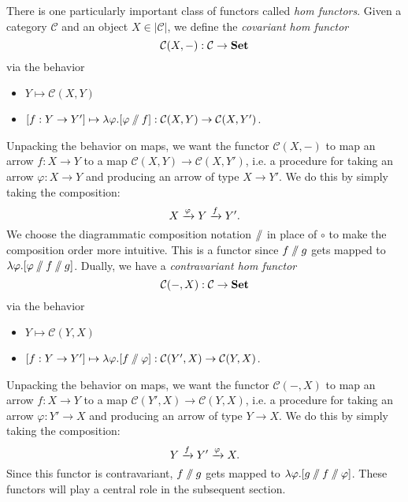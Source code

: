 There is one particularly important class of functors called \emph{hom functors}. Given a category $\mathcal{C}$ and an object $X\in|\mathcal{C}|$, we define the \emph{covariant hom functor}
\[\mathcal{C}(X,-):\mathcal{C}\to\mathbf{Set}\]
via the behavior
\begin{itemize}
\item $Y\mapsto \mathcal{C}(X,Y)$
\item $[f:Y\to Y']\mapsto \lambda \varphi.[\varphi\sslash f]:\mathcal{C}(X,Y)\to\mathcal{C}(X,Y')$.
\end{itemize}
Unpacking the behavior on maps, we want the functor $\mathcal{C}(X,-)$ to map an arrow $f:X\to Y$ to a map $\mathcal{C}(X,Y)\to\mathcal{C}(X,Y')$, i.e. a procedure for taking an arrow $\varphi:X\to Y$ and producing an arrow of type $X\to Y'$. We do this by simply taking the composition:
\[X\xrightarrow{\varphi} Y\xrightarrow{f} Y'.\]
We choose the diagrammatic composition notation $\sslash$ in place of $\circ$ to make the composition order more intuitive. This is a functor since $f\sslash g$ gets mapped to $\lambda\varphi.[\varphi\sslash f\sslash g]$. Dually, we have a \emph{contravariant hom functor} 
\[\mathcal{C}(-,X):\mathcal{C}\to\mathbf{Set}\]
via the behavior
\begin{itemize}
\item $Y\mapsto \mathcal{C}(Y,X)$
\item $[f:Y\to Y']\mapsto \lambda \varphi.[f\sslash \varphi]:\mathcal{C}(Y',X)\to\mathcal{C}(Y,X)$.
\end{itemize}
Unpacking the behavior on maps, we want the functor $\mathcal{C}(-,X)$ to map an arrow $f:X\to Y$ to a map $\mathcal{C}(Y',X)\to\mathcal{C}(Y,X)$, i.e. a procedure for taking an arrow $\varphi:Y'\to X$ and producing an arrow of type $Y\to X$. We do this by simply taking the composition:
\[Y\xrightarrow{f} Y'\xrightarrow{\varphi} X.\]
Since this functor is contravariant, $f\sslash g$ gets mapped to $\lambda\varphi.[g\sslash f\sslash \varphi]$.
These functors will play a central role in the subsequent section.

